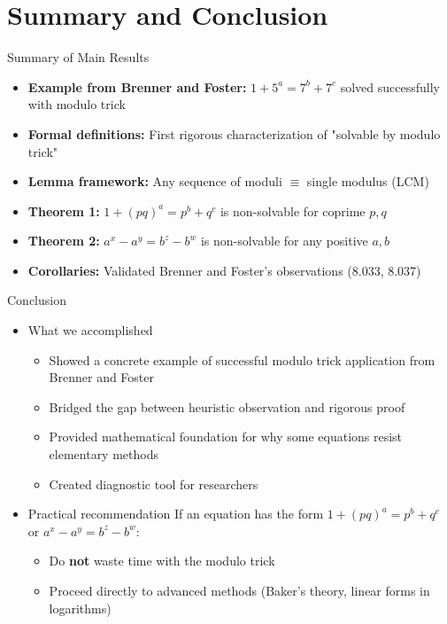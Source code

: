\section{Summary and Conclusion}

\begin{frame}{Summary of Main Results}
    \begin{itemize}
        \item \textbf{Example from Brenner and Foster:} $1+5^a = 7^b+7^c$ solved successfully with modulo trick
        \item \textbf{Formal definitions:} First rigorous characterization of "solvable by modulo trick"
        \item \textbf{Lemma framework:} Any sequence of moduli $\equiv$ single modulus (LCM)
        \item \textbf{Theorem 1:} $1+(pq)^a = p^b+q^c$ is non-solvable for coprime $p,q$
        \item \textbf{Theorem 2:} $a^x-a^y = b^z-b^w$ is non-solvable for any positive $a,b$
        \item \textbf{Corollaries:} Validated Brenner and Foster's observations (8.033, 8.037)
    \end{itemize}
\end{frame}

\begin{frame}{Conclusion}
\begin{itemize}
    \item[] \begin{block}{What we accomplished}
        \begin{itemize}
            \item Showed a concrete example of successful modulo trick application from Brenner and Foster
            \item Bridged the gap between heuristic observation and rigorous proof
            \item Provided mathematical foundation for why some equations resist elementary methods
            \item Created diagnostic tool for researchers
        \end{itemize}
    \end{block}

    \item[] \begin{block}{Practical recommendation}
        If an equation has the form $1+(pq)^a = p^b+q^c$ or $a^x-a^y = b^z-b^w$:
        \begin{itemize}
            \item Do \textbf{not} waste time with the modulo trick
            \item Proceed directly to advanced methods (Baker's theory, linear forms in logarithms)
        \end{itemize}
    \end{block}
\end{itemize}
\end{frame}

